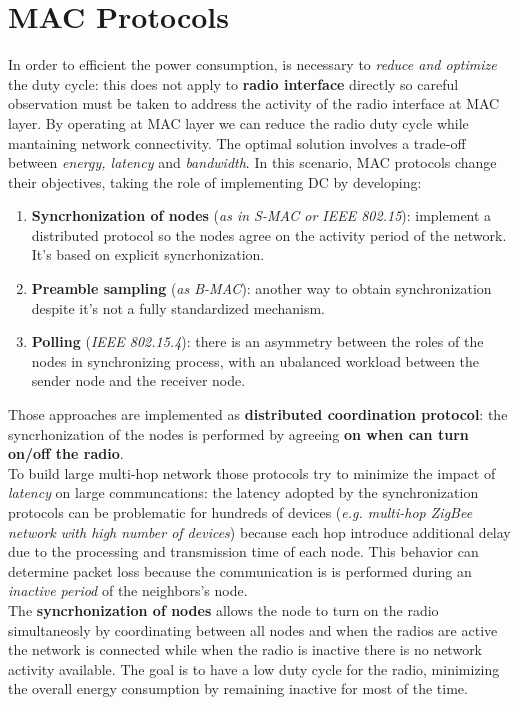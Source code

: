 \documentclass[10pt,a4paper]{report}
\theoremstyle{definition}
\begin{document}
\chapter{MAC Protocols}\label{sec:mac-protocols}
In order to efficient the power consumption, is necessary to \textit{reduce and optimize} the duty cycle: this does not apply to \textbf{radio interface} directly so careful observation must be taken to address the activity of the radio interface at MAC layer. By operating at MAC layer we can reduce the radio duty cycle while mantaining network connectivity.
The optimal solution involves a trade-off between \textit{energy, latency} and \textit{bandwidth}.
In this scenario, MAC protocols change their objectives, taking the role of implementing DC by developing:
\begin{enumerate}
	\item 
	\textbf{Syncrhonization of nodes} (\textit{as in S-MAC or IEEE 802.15}): implement a distributed protocol so the nodes agree on the activity period of the network. It's based on explicit syncrhonization.
	\item 
	\textbf{Preamble sampling} (\textit{as B-MAC}): another way to obtain synchronization despite it's not a fully standardized mechanism.
	\item 
	\textbf{Polling} (\textit{IEEE 802.15.4}): there is an asymmetry between the roles of the nodes in synchronizing process, with an ubalanced workload between the sender node and the receiver node.
\end{enumerate}

Those approaches are implemented as \textbf{distributed coordination protocol}: the syncrhonization of the nodes is performed by agreeing \textbf{on when can turn on/off the radio}.\\
To build large multi-hop network those protocols try to minimize the impact of \textit{latency} on large communcations: the latency adopted by the synchronization protocols can be problematic for hundreds of devices (\textit{e.g. multi-hop ZigBee network with high number of devices}) because each hop introduce additional delay due to the processing and transmission time of each node. This behavior can determine packet loss because the communication is is performed during an \textit{inactive period} of the neighbors's node.\\
The \textbf{syncrhonization of nodes} allows the node to turn on the radio simultaneosly by coordinating between all nodes and when the radios are active the network is connected while when the radio is inactive there is no network activity available.
The goal is to have a low duty cycle for the radio, minimizing the overall energy consumption by remaining inactive for most of the time.
\end{document}
